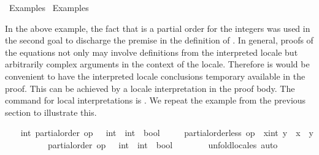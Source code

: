 %
\begin{isabellebody}%
\def\isabellecontext{Examples{\isadigit{3}}}%
%
\isadelimtheory
%
\endisadelimtheory
%
\isatagtheory
{}\isamarkupfalse%
\ Examples{}\isanewline
{}\ Examples\isanewline
{}%
\endisatagtheory
{\isafoldtheory}%
%
\isadelimtheory
%
\endisadelimtheory
%
\begin{isamarkuptext}%
\vspace{-5ex}%
\end{isamarkuptext}%
\isamarkuptrue%
%
\isamarkuptrue%
%
\begin{isamarkuptext}%
In the above example, the fact that  is a partial
  order for the integers was used in the second goal to
  discharge the premise in the definition of .  In
  general, proofs of the equations not only may involve definitions
  from the interpreted locale but arbitrarily complex arguments in the
  context of the locale.  Therefore is would be convenient to have the
  interpreted locale conclusions temporary available in the proof.
  This can be achieved by a locale interpretation in the proof body.
  The command for local interpretations is .  We
  repeat the example from the previous section to illustrate this.%
\end{isamarkuptext}%
\isamarkuptrue%
%
\isadelimvisible
\ \ %
\endisadelimvisible
%
\isatagvisible
{}\isamarkupfalse%
\ int{\isacharcolon}\ partial{\isacharunderscore}order\ {\isachardoublequoteopen}op\ {\isasymle}\ {\isacharcolon}{\isacharcolon}\ int\ {\isasymRightarrow}\ int\ {\isasymRightarrow}\ bool{\isachardoublequoteclose}\isanewline
\ \ \ \ \ {\isachardoublequoteopen}partial{\isacharunderscore}order{\isachardot}less\ op\ {\isasymle}\ {\isacharparenleft}x{\isacharcolon}{\isacharcolon}int{\isacharparenright}\ y\ {\isacharequal}\ {\isacharparenleft}x\ {\isacharless}\ y{\isacharparenright}{\isachardoublequoteclose}\isanewline
\ \ \isamarkupfalse%
\ {\isacharminus}\isanewline
\ \ \ \ \isamarkupfalse%
\ {\isachardoublequoteopen}partial{\isacharunderscore}order\ {\isacharparenleft}op\ {\isasymle}\ {\isacharcolon}{\isacharcolon}\ int\ {\isasymRightarrow}\ int\ {\isasymRightarrow}\ bool{\isacharparenright}{\isachardoublequoteclose}\isanewline
\ \ \ \ \ \ \isamarkupfalse%
\ unfold{\isacharunderscore}locales\ auto\isanewline

\end{isabellebody}
